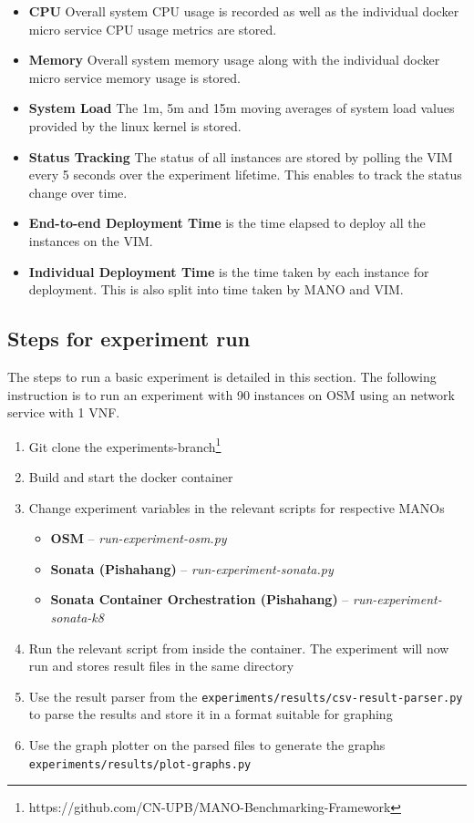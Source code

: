 \begin{itemize}
	\item{\textbf{CPU}} Overall system CPU usage is recorded as well as the individual docker micro service CPU usage metrics are stored.
	\item{\textbf{Memory}} Overall system memory usage along with the individual docker micro service memory usage is stored.
	\item{\textbf{System Load}} The 1m, 5m and 15m moving averages of system load values provided by the linux kernel is stored.
	\item{\textbf{Status Tracking}} The status of all instances are stored by polling the VIM every 5 seconds over the experiment lifetime. 
	This enables to track the status change over time.
	\item{\textbf{End-to-end Deployment Time}} is the time elapsed to deploy all the instances on the VIM.
	\item{\textbf{Individual Deployment Time}} is the time taken by each instance for deployment. 
	This is also split into time taken by MANO and VIM.
\end{itemize}

\subsection{Steps for experiment run} 

The steps to run a basic experiment is detailed in this section. 
The following instruction is to run an experiment with 90 instances on OSM using an network service with 1 VNF. 

\begin{enumerate}
	\item Git clone the experiments-branch\footnote{https://github.com/CN-UPB/MANO-Benchmarking-Framework}
	\item Build and start the docker container
	\item Change experiment variables in the relevant scripts for respective MANOs
	\begin{itemize}
		\item \textbf{OSM} -- \textit{run-experiment-osm.py}
		\item \textbf{Sonata (Pishahang)}  -- \textit{run-experiment-sonata.py}
		\item \textbf{Sonata Container Orchestration (Pishahang)} -- \textit{run-experiment-sonata-k8}
	\end{itemize}
	
	\item Run the relevant script from inside the container. 
	The experiment will now run and stores result files in the same directory
	\item Use the result parser from the \texttt{experiments/results/csv-result-parser.py} to parse the results and store it in a format suitable for graphing
	\item Use the graph plotter on the parsed files to generate the graphs\\ \texttt{experiments/results/plot-graphs.py}
	
	\end{enumerate}

